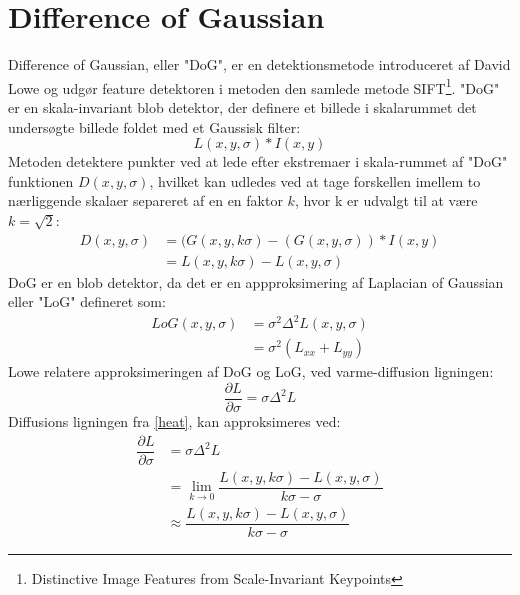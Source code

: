\section{Difference of Gaussian}
Difference of Gaussian, eller "DoG", er en detektionsmetode introduceret  af David Lowe \cite{sift} og udgør feature detektoren i metoden den samlede metode SIFT\footnote{Distinctive Image Features
from Scale-Invariant Keypoints}. "DoG" er en skala-invariant blob detektor, der definere et billede i skalarummet det undersøgte billede foldet med et Gaussisk filter:
\begin{equation}
L(x,y,\sigma) \ast I(x,y)
\end{equation}
Metoden detektere punkter ved at lede efter ekstremaer i skala-rummet af "DoG" funktionen $ D(x,y,\sigma) $, hvilket kan udledes ved at tage forskellen imellem to nærliggende skalaer separeret af en en faktor $k$, hvor k er udvalgt til at være $k=\sqrt{2}$:
\begin{equation}
\begin{split}
D(x,y,\sigma) &= (G(x,y,k\sigma)-(G(x,y,\sigma))\ast I(x,y) \\
           &= L(x,y,k \sigma)-L(x,y,\sigma)
\end{split}
\end{equation}
DoG er en blob detektor, da det er en appproksimering af Laplacian of Gaussian eller "LoG" defineret som:
\begin{equation}
\begin{split}
LoG(x,y,\sigma) &= \sigma^2 \Delta^2L(x,y,\sigma) \\
                &= \sigma^2 (L_{xx}+L_{yy})
\end{split}
\end{equation}
Lowe relatere approksimeringen af DoG og LoG, ved varme-diffusion ligningen:
\begin{equation}
\dfrac{\partial L}{\partial \sigma} = \sigma \Delta^2L
\label{heat}
\end{equation}
Diffusions ligningen fra \eqref{heat}, kan approksimeres ved:
\begin{equation}
\begin{split}
\dfrac{\partial L}{\partial \sigma} &= \sigma \Delta^2L \\
&= \lim_{k \to 0} \dfrac{L(x,y,k\sigma)-L(x,y,\sigma)}{k\sigma-\sigma} \\
&\approx \dfrac{L(x,y,k\sigma)-L(x,y,\sigma)}{k\sigma-\sigma}
\end{split}
\label{difference}
\end{equation}
